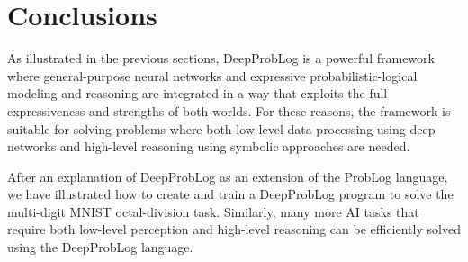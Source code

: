 \section{Conclusions}
\label{sec:conclusions}

As illustrated in the previous sections, DeepProbLog is a powerful framework where general-purpose neural
networks and expressive probabilistic-logical modeling and reasoning are integrated in a way that exploits the full expressiveness and strengths of both worlds. For these reasons, the framework is suitable for solving problems where both low-level data processing using deep networks and high-level reasoning using symbolic approaches are needed.

After an explanation of DeepProbLog as an extension of the ProbLog language, we have illustrated how to create and train a DeepProbLog program to solve the multi-digit MNIST octal-division task. Similarly, many more AI tasks that require both low-level perception and high-level reasoning can be efficiently solved using the DeepProbLog language.




